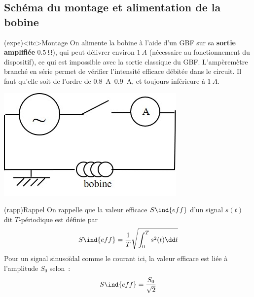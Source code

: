 \documentclass[../main/main.tex]{subfiles}
\begin{document}
\subsection{Schéma du montage et alimentation de la bobine}
\begin{tcb}[sidebyside, righthand ratio=.40](expe)<itc>{Montage}
	On alimente la bobine à l'aide d'un GBF sur sa \textbf{sortie amplifiée}
	$\SI{0,5}{\ohm}$), qui peut délivrer environ $\SI{1}{A}$ (nécessaire au
	fonctionnement du dispositif), ce qui est impossible avec la sortie
	classique du GBF.
	\bigbreak
	L'ampèremètre branché en série permet de vérifier l'intensité efficace
	débitée dans le circuit. Il faut qu'elle soit de l'ordre de
	\SIrange{0.8}{0.9}{A}, et toujours inférieure à $\SI{1}{A}$.
	\tcblower
	\begin{center}
		\includegraphics[width=\linewidth]{gamma3}
	\end{center}
\end{tcb}

\begin{tcb}[sidebyside](rapp){Rappel}
	On rappelle que la valeur efficace $S\ind{eff}$ d'un signal $s(t)$ dit
	$T$-périodique est définie par
	\[
		S\ind{eff} = \frac{1}{T} \sqrt{\int_{0}^{T} s^2(t)\dd t}
	\]
	\tcblower
	Pour un signal sinusoïdal comme le courant ici, la valeur efficace est liée
	à l'amplitude $S_0$ selon~:
	\[
		S\ind{eff} = \frac{S_0}{\sqrt{2}}
	\]
\end{tcb}
\end{document}

